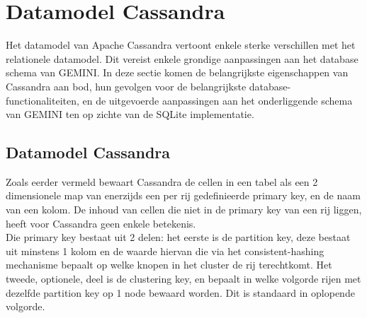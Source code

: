 \chapter{Datamodel Cassandra}
\label{cassandra_datamodel}

Het datamodel van Apache Cassandra vertoont enkele sterke verschillen met het relationele datamodel. Dit vereist enkele grondige aanpassingen aan het database schema van GEMINI. In deze sectie komen de belangrijkste eigenschappen van Cassandra aan bod, hun gevolgen voor de belangrijkste database-functionaliteiten, en de uitgevoerde aanpassingen aan het onderliggende schema van GEMINI ten op zichte van de SQLite implementatie.

\section{Datamodel Cassandra}

Zoals eerder vermeld bewaart Cassandra de cellen in een tabel als een 2 dimensionele map van enerzijds een per rij gedefinieerde primary key, en de naam van een kolom. De inhoud van cellen die niet in de primary key van een rij liggen, heeft voor Cassandra geen enkele betekenis.\\
Die primary key bestaat uit 2 delen: het eerste is de partition key, deze bestaat uit minstens 1 kolom en de waarde hiervan die via het consistent-hashing mechanisme bepaalt op welke knopen in het cluster de rij terechtkomt. Het tweede, optionele, deel is de clustering key, en bepaalt in welke volgorde rijen met dezelfde partition key op 1 node bewaard worden. Dit is standaard in oplopende volgorde.\\\\

